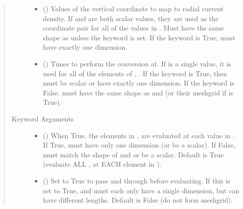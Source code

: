 \documentclass[letterpaper,10pt,english]{sphinxmanual}
\begin{document}
\begin{fulllineitems}
\begin{fulllineitems}
\begin{quote}
\begin{description}
\begin{itemize}
\item {} 
 () \textendash{} Values of the vertical coordinate to
map to radial current density. If  and  are both scalar
values, they are used as the coordinate pair for all of the
values in . Must have the same shape as  unless the
 keyword is set. If the  keyword is True,
 must have exactly one dimension.

\item {} 
 () \textendash{} Times to perform the conversion at.
If  is a single value, it is used for all of the elements of
, . If the  keyword is True, then  must be
scalar or have exactly one dimension. If the  keyword is
False,  must have the same shape as  and  (or their
meshgrid if  is True).

\end{itemize}

\item[{Keyword Arguments}] \leavevmode\begin{itemize}
\item {} 
 () \textendash{} When True, the elements in ,  are evaluated
at each value in . If True,  must have only one dimension
(or be a scalar). If False,  must match the shape of  and
 or be a scalar. Default is True (evaluate ALL ,  at
EACH element in ).

\item {} 
 () \textendash{} Set to True to pass  and  through
 before evaluating. If this is set to
True,  and  must each only have a single dimension, but
can have different lengths. Default is False (do not form
meshgrid).


\end{itemize}
\end{description}
\end{quote}
\end{fulllineitems}
\end{fulllineitems}
\end{document}
